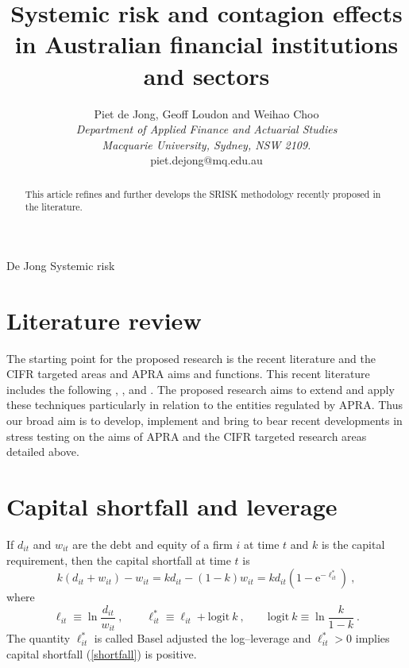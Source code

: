 \documentclass[authoryear]{elsarticle}
\newcommand{\logit}{\mathrm{logit}}
\newcommand{\e}{\mathrm{e}}
\newcommand{\eref}[1]{(\ref{#1})}
\newcommand{\cq}{\ , \qquad}
\newcommand{\be}[1]{\begin{equation}\label{#1}}
\newcommand{\ee}{\end{equation}}
\begin{document}
\title{Systemic risk and contagion effects in Australian financial institutions and sectors}
\author{Piet de Jong,  Geoff Loudon and Weihao Choo \\[4pt]
\textit{Department of Applied Finance and Actuarial Studies\\ Macquarie University, Sydney, NSW 2109.}
\\[2pt]
{piet.dejong@mq.edu.au}}

\markboth%
{De Jong}
{Systemic risk}

\begin{abstract}
This article refines and further develops the SRISK methodology recently proposed in the literature.
\end{abstract}

\maketitle

\section{Literature review}

The starting point for the proposed research is the recent literature and the CIFR targeted areas and APRA aims and functions.
This recent literature includes the following
\cite{adrian2011covar},
\cite{acharya2012capital},
\cite{acharya2012measuring}
and \cite{brownlees2010volatility}.   The proposed research aims to extend and apply these techniques particularly in relation to the entities regulated by APRA.   Thus our  broad aim is to develop, implement and bring to bear recent developments in stress testing  on the aims of APRA and the CIFR targeted research areas detailed above.   




\section{Capital shortfall and leverage}

If $d_{it}$ and $w_{it}$ are the debt and equity of a firm $i$ at time $t$ and $k$ is the capital requirement,  then the capital shortfall at time $t$ is 
\be{shortfall}
k(d_{it}+w_{it}) - w_{it} = kd_{it}  - (1-k) w_{it} = kd_{it}\left(1-\e^{-\ell^*_{it}}\right)\ ,
\ee
where 
$$
\ell_{it} \equiv \ln\frac{d_{it}}{w_{it}}\cq \ell_{it}^* \equiv \ell_{it} + \logit\ k \cq \logit\ k\equiv \ln \frac{k}{1-k} \ .
$$
The quantity $\ell^*_{it}$ is called Basel adjusted the log--leverage and $\ell^*_{it}>0$ implies capital shortfall \eref{shortfall} is positive. 
\end{document}
